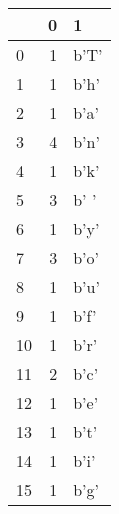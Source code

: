 \begin{tabular}{lrl}
\toprule
{} &  0 &     1 \\
\midrule
0  &  1 &  b'T' \\
1  &  1 &  b'h' \\
2  &  1 &  b'a' \\
3  &  4 &  b'n' \\
4  &  1 &  b'k' \\
5  &  3 &  b' ' \\
6  &  1 &  b'y' \\
7  &  3 &  b'o' \\
8  &  1 &  b'u' \\
9  &  1 &  b'f' \\
10 &  1 &  b'r' \\
11 &  2 &  b'c' \\
12 &  1 &  b'e' \\
13 &  1 &  b't' \\
14 &  1 &  b'i' \\
15 &  1 &  b'g' \\
\bottomrule
\end{tabular}
